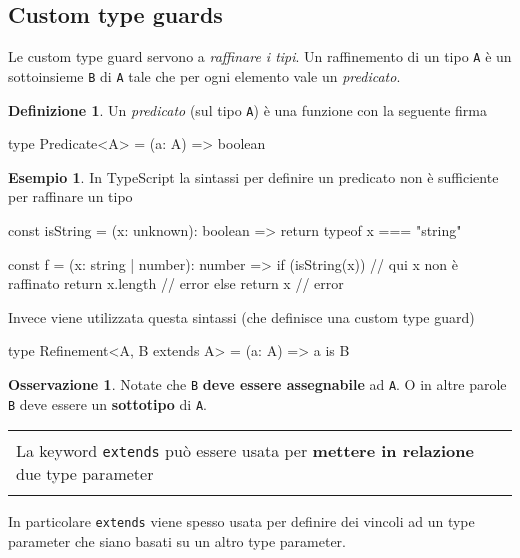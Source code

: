 \documentclass[12pt]{article}
\theoremstyle{definition}
\newtheorem{definition}{Definizione}[section]
\newtheorem{example}{Esempio}[subsection]
\newtheorem{observation}{Osservazione}[subsection]
\newenvironment{boxed}
    {\begin{center}
    \begin{tabular}{|p{0.9\textwidth}|}
    \hline\\
    }
    {
    \\\\\hline
    \end{tabular}
    \end{center}
    }
\newenvironment{code}
  {\vspace{0.5cm} \VerbatimEnvironment\begin{typescriptcode}}
  {\end{typescriptcode} \vspace{0.2cm}}
\begin{document}
\subsection{Custom type guards}

Le custom type guard servono a \emph{raffinare i tipi}. Un raffinemento di un tipo \texttt{A} è un sottoinsieme \texttt{B} di \texttt{A}
tale che per ogni elemento vale un \emph{predicato}.

\begin{definition}
Un \emph{predicato} (sul tipo \texttt{A}) è una funzione con la seguente firma

\begin{code}
type Predicate<A> = (a: A) => boolean
\end{code}
\end{definition}

\begin{example}
In TypeScript la sintassi per definire un predicato non è sufficiente per raffinare un tipo

\begin{code}
const isString = (x: unknown): boolean => {
  return typeof x === "string"
}

const f = (x: string | number): number => {
  if (isString(x)) {
    // qui x non è raffinato
    return x.length // error
  } else {
    return x // error
  }
}
\end{code}
\end{example}

Invece viene utilizzata questa sintassi (che definisce una custom type guard)

\begin{code}
type Refinement<A, B extends A> = (a: A) => a is B
\end{code}

\begin{observation}
Notate che \texttt{B} \textbf{deve essere assegnabile} ad \texttt{A}.
O in altre parole \texttt{B} deve essere un \textbf{sottotipo} di \texttt{A}.
\end{observation}

\begin{boxed}
La keyword \texttt{extends} può essere usata per \textbf{mettere in relazione} due type parameter
\end{boxed}

In particolare \texttt{extends} viene spesso usata per definire dei vincoli ad un type parameter che siano basati su un altro type parameter.
\end{document}

